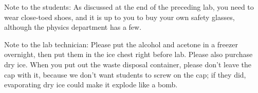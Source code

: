 \label{lab:absolute-zero}

Note to the students:
As discussed at the end of the preceding lab, you need to wear close-toed
shoes, and it is up to you
to buy your own safety glasses, although the physics department
has a few. 

Note to the lab technician: 
Please put the alcohol and acetone in a freezer overnight, then
put them in the ice chest right before lab. Please also purchase
dry ice. When you put out the waste disposal container, please
don't leave the cap with it, because we don't want students to screw
on the cap; if they did, evaporating dry ice could make it explode like a bomb.

\apparatus
{}

\introduction

